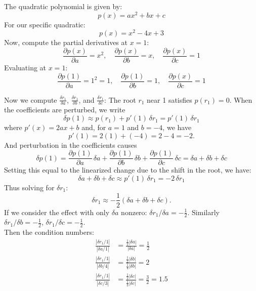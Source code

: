 \documentclass[lang=cn,11pt]{elegantbook}
\begin{document}
\begin{solution}
The quadratic polynomial is given by: \[
p(x) = ax^2 + bx + c
\]
For our specific quadratic:
\[
p(x) = x^2 - 4x + 3
\]
Now, compute the partial derivatives at \( x = 1 \):  \[
   \frac{\partial p(x)}{\partial a} = x^2,\quad  \frac{\partial p(x)}{\partial b} = x, \quad   \frac{\partial p(x)}{\partial c} = 1
   \]Evaluating at \( x = 1 \): \[
   \frac{\partial p(1)}{\partial a} = 1^2 = 1,\quad  \frac{\partial p(1)}{\partial b} = 1,\quad  \frac{\partial p(x)}{\partial c} = 1
   \]

Now we compute \( \frac{\delta r_1}{\delta a} \), \( \frac{\delta r_1}{\delta b} \), and \( \frac{\delta r_1}{\delta c} \): 
The root \(r_1\) near 1 satisfies \(p(r_1)=0\). When the coefficients are perturbed, we write
\[
\delta p(1) \approx p(r_1) + p'(1)\,\delta r_1 =  p'(1)\,\delta r_1 
\]
where \(p'(x)=2ax+b\) and, for \(a=1\) and \(b=-4\), we have
\[
p'(1)=2(1)+(-4)=2-4=-2.
\]
And perturbation in the coefficients causes
\[
\delta p(1)=\frac{\partial p(1)}{\partial a}\,\delta a+\frac{\partial p(1)}{\partial b}\,\delta b+\frac{\partial p(1)}{\partial c}\,\delta c = \delta a+\delta b+\delta c
\]
Setting this equal to the linearized change due to the shift in the root, we have: \[
\delta a+\delta b+\delta c \approx p'(1)\,\delta r_1 = -2\,\delta r_1
\]
Thus solving for \(\delta r_1\): \[
\delta r_1 \approx -\frac{1}{2}(\delta a+\delta b+\delta c).
\]
If we consider the effect with only \(\delta a\) nonzero: \(\delta r_1/\delta a = -\frac{1}{2}\). Similarly \(\delta r_1/\delta b = -\frac{1}{2}\), \(\delta r_1/\delta c = -\frac{1}{2}\).\\
Then the condition numbers: 
\begin{align*}
     \frac{|\delta r_1/1|}{|\delta a/1|} &= \frac{\frac{1}{2}|\delta a|}{|\delta a|} = \frac{1}{2}\\  \frac{|\delta r_1/1|}{|\delta b/4|} &= \frac{\frac{1}{2}|\delta b|}{\frac{1}{4}|\delta b|} = 2 \\
      \frac{|\delta r_1/1|}{|\delta c/3|} &= \frac{\frac{1}{2}|\delta c|}{\frac{1}{3}|\delta c|} = \frac{3}{2} = 1.5
\end{align*}\end{solution}
\end{document}
